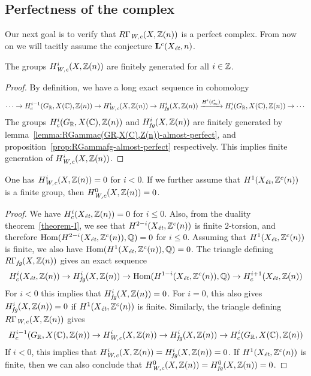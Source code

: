 \documentclass{article}
\numberwithin{equation}{section}
\begin{document}
\subsection*{Perfectness of the complex}

Our next goal is to verify that $R\Gamma_\Wc (X, \ZZ(n))$ is a perfect
complex. From now on we will tacitly assume the conjecture
$\mathbf{L}^c (X_\et,n)$.

\begin{lemma}
  The groups $H^i_\Wc (X, \ZZ(n))$ are finitely generated for all $i \in \ZZ$.

  \begin{proof}
    By definition, we have a long exact sequence in cohomology
    \[ \cdots \to H^{i-1}_c (G_\RR, X (\CC), \ZZ (n)) \to
      H^i_\Wc (X,\ZZ(n)) \to
      H^i_\fg (X,\ZZ(n)) \xrightarrow{H^i (i_\infty^*)}
      H^i_c (G_\RR, X (\CC), \ZZ (n)) \to \cdots \]
    The groups $H^i_c (G_\RR, X (\CC), \ZZ (n))$ and $H^i_\fg (X, \ZZ(n))$ are
    finitely generated by lemma~\ref{lemma:RGammac(GR,X(C),Z(n))-almost-perfect},
    and proposition~\ref{prop:RGammafg-almost-perfect} respectively.
    This implies finite generation of $H^i_\Wc (X, \ZZ(n))$.
  \end{proof}
\end{lemma}

\begin{lemma}
  One has $H^i_\Wc (X,\ZZ(n)) = 0$ for $i < 0$. If we further assume that
  $H^1 (X_\et, \ZZ^c(n))$ is a finite group, then $H^0_\Wc (X,\ZZ(n)) = 0$.

  \begin{proof}
    We have $H^i_c (X_\et, \ZZ(n)) = 0$ for $i \le 0$. Also, from the duality
    theorem~\ref{theorem-I}, we see that $H^{2-i} (X_\et, \ZZ^c (n))$ is finite
    $2$-torsion, and therefore $\Hom (H^{2-i} (X_\et, \ZZ^c (n)), \QQ) = 0$ for
    $i \le 0$. Assuming that $H^1 (X_\et, \ZZ^c (n))$ is finite, we also have
    $\Hom (H^1 (X_\et, \ZZ^c (n)), \QQ) = 0$. The triangle defining
    $R\Gamma_\fg (X, \ZZ(n))$ gives an exact sequence
    \[ H^i_c (X_\et, \ZZ(n)) \to
      H^i_\fg (X, \ZZ(n)) \to
      \Hom (H^{1-i} (X_\et, \ZZ^c (n)), \QQ) \to
      H^{i+1}_c (X_\et, \ZZ(n)) \]
    For $i < 0$ this implies that $H^i_\fg (X, \ZZ(n)) = 0$.
    For $i = 0$, this also gives $H^i_\fg (X, \ZZ(n)) = 0$
    if $H^1 (X_\et, \ZZ^c (n))$ is finite.
    Similarly, the triangle defining $R\Gamma_\Wc (X, \ZZ(n))$ gives
    \[ H^{i-1}_c (G_\RR, X (\CC), \ZZ (n)) \to
      H^i_\Wc (X, \ZZ(n)) \to
      H^i_\fg (X, \ZZ(n)) \to
      H^i_c (G_\RR, X (\CC), \ZZ (n)) \]
    If $i < 0$, this implies that
    $H^i_\Wc (X, \ZZ(n)) = H^i_\fg (X, \ZZ(n)) = 0$.
    If $H^1 (X_\et, \ZZ^c (n))$ is finite, then we can also conclude that
    $H^0_\Wc (X, \ZZ(n)) = H^0_\fg (X, \ZZ(n)) = 0$.
  \end{proof}
\end{lemma}
\end{document}
